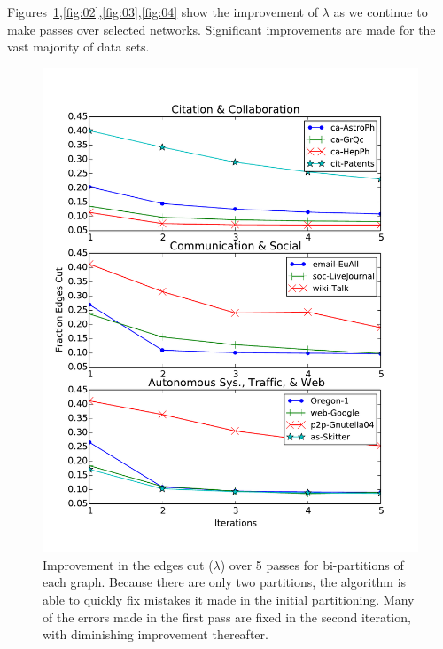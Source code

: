 Figures~\ref{fig:01},\ref{fig:02},\ref{fig:03},\ref{fig:04} show the improvement of $\lambda$ as we continue to make passes over selected networks. 
Significant improvements are made for the vast majority of data sets.




\begin{figure}[h!]
\centering
\includegraphics[width=0.9\columnwidth] {figures/real_k2_lambda}
\caption[Caption for]{Improvement in the edges cut ($\lambda$) over 5 passes for bi-partitions of each graph. Because there are only two partitions, the algorithm is able to quickly fix mistakes it made in the initial partitioning. Many of the errors made in the first pass are fixed in the second iteration, with diminishing improvement thereafter.}
\label{fig:01}
\end{figure}

